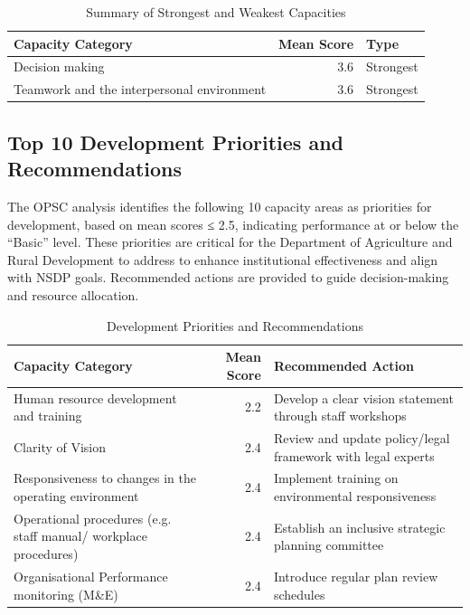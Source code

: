 \documentclass[
  10pt,
]{report}
\begin{document}
\begingroup\fontsize{8}{10}\selectfont

\begin{longtable}[t]{>{\raggedright\arraybackslash}p{7cm}rl}
\caption{\label{tab:unnamed-chunk-6}Summary of Strongest and Weakest Capacities}\\
\toprule
\textbf{Capacity Category} & \textbf{Mean Score} & \textbf{Type}\\
\midrule
Decision making & 3.6 & Strongest\\
Teamwork and the interpersonal environment & 3.6 & Strongest\\
\bottomrule
\end{longtable}
\endgroup{}

\subsection{Top 10 Development Priorities and
Recommendations}\label{top-10-development-priorities-and-recommendations}

The OPSC analysis identifies the following 10 capacity areas as
priorities for development, based on mean scores ≤ 2.5, indicating
performance at or below the ``Basic'' level. These priorities are
critical for the Department of Agriculture and Rural Development to
address to enhance institutional effectiveness and align with NSDP
goals. Recommended actions are provided to guide decision-making and
resource allocation.

\begingroup\fontsize{8}{10}\selectfont

\begin{longtable}[t]{lr>{\raggedright\arraybackslash}p{7cm}}
\caption{\label{tab:unnamed-chunk-7}Development Priorities and Recommendations}\\
\toprule
\textbf{Capacity Category} & \textbf{Mean Score} & \textbf{Recommended Action}\\
\midrule
Human resource development and training & 2.2 & Develop a clear vision statement through staff workshops\\
Clarity of Vision & 2.4 & Review and update policy/legal framework with legal experts\\
Responsiveness to changes in the operating environment & 2.4 & Implement training on environmental responsiveness\\
Operational procedures (e.g. staff manual/ workplace procedures) & 2.4 & Establish an inclusive strategic planning committee\\
Organisational Performance monitoring (M\&E) & 2.4 & Introduce regular plan review schedules\\
\bottomrule
\end{longtable}
\endgroup{}
\end{document}
